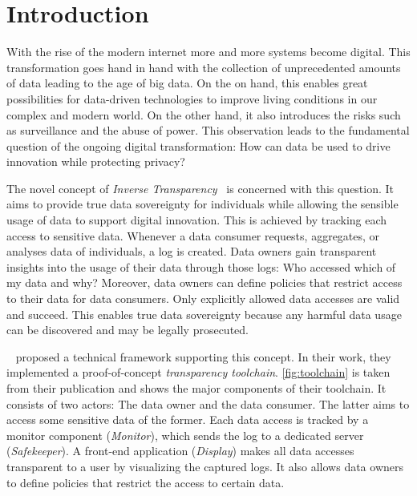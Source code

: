 \documentclass[../main.tex]{subfiles}
\begin{document}
\chapter{Introduction}
With the rise of the modern internet more and more systems become digital.
This transformation goes hand in hand with the collection of unprecedented amounts of data leading to the age of big data.
On the on hand, this enables great possibilities for data-driven technologies to improve living conditions in our complex and modern world.
On the other hand, it also introduces the risks such as surveillance and the abuse of power.
This observation leads to the fundamental question of the ongoing digital transformation: How can data be used to drive innovation while protecting privacy?~\cite{Boes2022, Schallmo2016}

The novel concept of \emph{Inverse Transparency}~\cite{Boes2022} is concerned with this question.
It aims to provide true data sovereignty for individuals while allowing the sensible usage of data to support digital innovation.
This is achieved by tracking each access to sensitive data.
Whenever a data consumer requests, aggregates, or analyses data of individuals, a log is created.
Data owners gain transparent insights into the usage of their data through those logs:
Who accessed which of my data and why?
Moreover, data owners can define policies that restrict access to their data for data consumers.
Only explicitly allowed data accesses are valid and succeed.
This enables true data sovereignty because any harmful data usage can be discovered and may be legally prosecuted.

\citeauthor{Zieglmeier2021}~\cite{Zieglmeier2021} proposed a technical framework supporting this concept.
In their work, they implemented a proof-of-concept \emph{transparency toolchain}.
\cref{fig:toolchain} is taken from their publication and shows the major components of their toolchain.
It consists of two actors: The data owner and the data consumer.
The latter aims to access some sensitive data of the former.
Each data access is tracked by a monitor component (\emph{Monitor}), which sends the log to a dedicated server (\emph{Safekeeper}).
A front-end application (\emph{Display}) makes all data accesses transparent to a user by visualizing the captured logs.
It also allows data owners to define policies that restrict the access to certain data.
\end{document}
